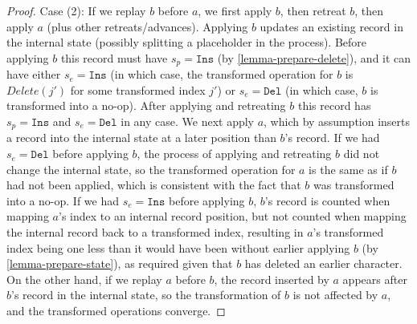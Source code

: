 \documentclass[sigplan,10pt]{acmart}
\begin{document}
\begin{proof}
  Case (2): If we replay $b$ before $a$, we first apply $b$, then retreat $b$, then apply $a$ (plus other retreats/advances).
  Applying $b$ updates an existing record in the internal state (possibly splitting a placeholder in the process).
  Before applying $b$ this record must have $s_p = \texttt{Ins}$ (by \autoref{lemma-prepare-delete}), and it can have either $s_e = \texttt{Ins}$ (in which case, the transformed operation for $b$ is $\mathit{Delete}(j')$ for some transformed index $j'$) or $s_e = \texttt{Del}$ (in which case, $b$ is transformed into a no-op).
  After applying and retreating $b$ this record has $s_p = \texttt{Ins}$ and $s_e = \texttt{Del}$ in any case.
  We next apply $a$, which by assumption inserts a record into the internal state at a later position than $b$'s record.
  If we had $s_e = \texttt{Del}$ before applying $b$, the process of applying and retreating $b$ did not change the internal state, so the transformed operation for $a$ is the same as if $b$ had not been applied, which is consistent with the fact that $b$ was transformed into a no-op.
  If we had $s_e = \texttt{Ins}$ before applying $b$, $b$'s record is counted when mapping $a$'s index to an internal record position, but not counted when mapping the internal record back to a transformed index, resulting in $a$'s transformed index being one less than it would have been without earlier applying $b$ (by \autoref{lemma-prepare-state}), as required given that $b$ has deleted an earlier character.
  On the other hand, if we replay $a$ before $b$, the record inserted by $a$ appears after $b$'s record in the internal state, so the transformation of $b$ is not affected by $a$, and the transformed operations converge.
\end{proof}
\end{document}
